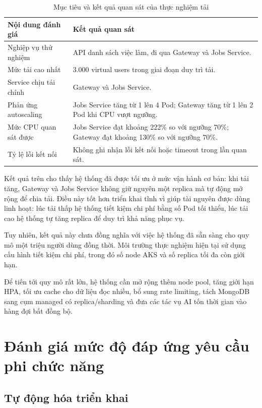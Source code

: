 \documentclass[../DoAn.tex]{subfiles}
\begin{document}
\begin{table}[H]
\centering
\caption{Mục tiêu và kết quả quan sát của thực nghiệm tải}
\label{tab:load-test-result}
\begin{tabular}{|p{}|p{}|}
\hline
\textbf{Nội dung đánh giá} & \textbf{Kết quả quan sát} \\ \hline
Nghiệp vụ thử nghiệm & API danh sách việc làm, đi qua Gateway và Jobs Service. \\ \hline
Mức tải cao nhất & 3.000 virtual users trong giai đoạn duy trì tải. \\ \hline
Service chịu tải chính & Gateway và Jobs Service. \\ \hline
Phản ứng autoscaling & Jobs Service tăng từ 1 lên 4 Pod; Gateway tăng từ 1 lên 2 Pod khi CPU vượt ngưỡng. \\ \hline
Mức CPU quan sát được & Jobs Service đạt khoảng 222\% so với ngưỡng 70\%; Gateway đạt khoảng 130\% so với ngưỡng 70\%. \\ \hline
Tỷ lệ lỗi kết nối & Không ghi nhận lỗi kết nối hoặc timeout trong lần quan sát. \\ \hline
\end{tabular}
\end{table}

Kết quả trên cho thấy hệ thống đã được tối ưu ở mức vận hành cơ bản: khi tải tăng, Gateway và Jobs Service không giữ nguyên một replica mà tự động mở rộng để chia tải. Điều này tốt hơn triển khai tĩnh vì giúp tài nguyên được dùng linh hoạt: lúc tải thấp hệ thống tiết kiệm chi phí bằng số Pod tối thiểu, lúc tải cao hệ thống tự tăng replica để duy trì khả năng phục vụ.

Tuy nhiên, kết quả này chưa đồng nghĩa với việc hệ thống đã sẵn sàng cho quy mô một triệu người dùng đồng thời. Môi trường thực nghiệm hiện tại sử dụng cấu hình tiết kiệm chi phí, trong đó số node AKS và số replica tối đa còn giới hạn.

Để tiến tới quy mô rất lớn, hệ thống cần mở rộng thêm node pool, tăng giới hạn HPA, tối ưu cache cho dữ liệu đọc nhiều, bổ sung rate limiting, tách MongoDB sang cụm managed có replica/sharding và đưa các tác vụ AI tốn thời gian vào hàng đợi bất đồng bộ.

\section{Đánh giá mức độ đáp ứng yêu cầu phi chức năng}

\subsection{Tự động hóa triển khai}
\end{document}
